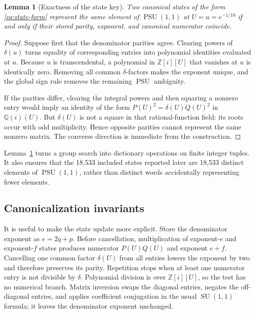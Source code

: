 \documentclass[11pt,a4paper]{article}
\newtheorem{lemma}[theorem]{Lemma}
\theoremstyle{definition}
\newcommand{\Z}{\mathbb Z}
\newcommand{\Q}{\mathbb Q}
\newcommand{\PSU}{\operatorname{PSU}}
\newcommand{\SU}{\operatorname{SU}}
\begin{document}
\begin{lemma}[Exactness of the state key]\label{lem:key}
Two canonical states of the form \eqref{eq:state-form} represent the same
element of \(\PSU(1,1)\) at \(U=u=e^{-1/10}\) if and only if their stored
parity, exponent, and canonical numerator coincide.
\end{lemma}

\begin{proof}
Suppose first that the denominator parities agree.  Clearing powers of
\(\delta(u)\) turns equality of corresponding entries into polynomial
identities evaluated at \(u\).  Because \(u\) is transcendental, a polynomial
in \(\Z[i][U]\) that vanishes at \(u\) is identically zero.  Removing all
common \(\delta\)-factors makes the exponent unique, and the global sign rule
removes the remaining \(\PSU\) ambiguity.

If the parities differ, clearing the integral powers and then squaring a
nonzero entry would imply an identity of the form
\(P(U)^2=\delta(U)Q(U)^2\) in \(\Q(i)(U)\).  But \(\delta(U)\) is not a square
in that rational-function field: its roots occur with odd multiplicity.
Hence opposite parities cannot represent the same nonzero matrix.  The
converse direction is immediate from the construction.
\end{proof}

Lemma~\ref{lem:key} turns a group search into dictionary operations on finite
integer tuples.  It also ensures that the 18,533 included states reported
later are 18,533 distinct elements of \(\PSU(1,1)\), rather than distinct
words accidentally representing fewer elements.

\subsection{Canonicalization invariants}

It is useful to make the state update more explicit.  Store the denominator
exponent as \(e=2q+p\).  Before cancellation, multiplication of exponent-\(e\)
and exponent-\(f\) states produces numerator \(P(U)Q(U)\) and exponent
\(e+f\).  Cancelling one common factor \(\delta(U)\) from all entries lowers
the exponent by two and therefore preserves its parity.  Repetition stops
when at least one numerator entry is not divisible by \(\delta\).  Polynomial
division is over \(\Z[i][U]\), so the test has no numerical branch.  Matrix
inversion swaps the diagonal entries, negates the off-diagonal entries, and
applies coefficient conjugation in the usual \(\SU(1,1)\) formula; it leaves
the denominator exponent unchanged.
\end{document}
